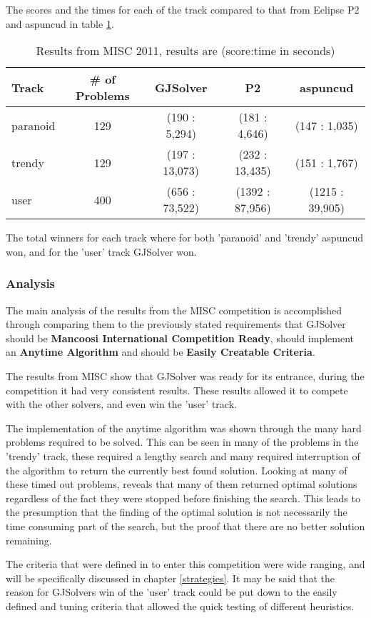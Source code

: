 The scores and the times for each of the track compared to that from Eclipse P2 and aspuncud in table \ref{impl.misc2011}.
\begin{table}
\begin{tabular}{| l | c | c | c | c |}\hline
Track & \# of Problems & GJSolver & P2 & aspuncud\\ \hline
paranoid & 129 & (190 : 5,294) & (181 : 4,646) & (147 : 1,035) \\ \hline
trendy & 129 & (197 : 13,073) & (232 : 13,435) & (151 : 1,767) \\ \hline
user & 400 & (656 : 73,522) & (1392 : 87,956) & (1215 : 39,905) \\ \hline
\end{tabular}
\caption{Results from MISC 2011, results are (score:time in seconds)}
\label{impl.misc2011}
\end{table}

The total winners for each track where for both 'paranoid' and 'trendy' aspuncud won, and for the 'user' track GJSolver won.

\subsubsection{Analysis}
The main analysis of the results from the MISC competition is accomplished through comparing them to the previously stated requirements that
GJSolver should be \textbf{Mancoosi International Competition Ready}, should implement an \textbf{Anytime Algorithm} and should be \textbf{Easily Creatable Criteria}.

The results from MISC show that GJSolver was ready for its entrance, during the competition it had very consistent results.
These results allowed it to compete with the other solvers, and even win the 'user' track.

The implementation of the anytime algorithm was shown through the many hard problems required to be solved.
This can be seen in many of the problems in the 'trendy' track, these required a lengthy search and many required interruption of the algorithm to return the currently best found solution.
Looking at many of these timed out problems, reveals that many of them returned optimal solutions regardless of the fact they were stopped before finishing the search.
This leads to the presumption that the finding of the optimal solution is not necessarily the time consuming part of the search, but the proof that there are no better solution remaining.

The criteria that were defined in to enter this competition were wide ranging, and will be specifically discussed in chapter \ref{strategies}.
It may be said that the reason for GJSolvers win of the 'user' track could be put down to the easily defined and tuning criteria that allowed the quick testing of different heuristics.


